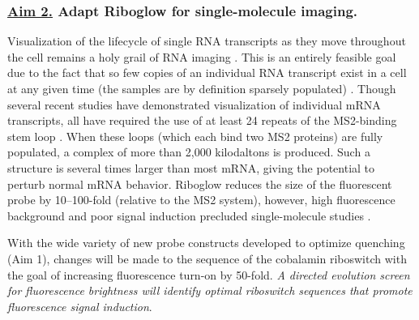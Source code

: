 \subsubsection*{\underline{Aim 2.} Adapt Riboglow for single-molecule imaging.}
Visualization of the lifecycle of single RNA transcripts as they move throughout the cell remains a holy grail of RNA imaging \cite{LiCentraldogmasinglemolecule2011}.
This is an entirely feasible goal due to the fact that so few copies of an individual RNA transcript exist in a cell at any given time (the samples are by definition sparsely populated) \cite{CabiliLocalizationabundanceanalysis2015,LiCentraldogmasinglemolecule2011,AndreckaSinglemoleculetrackingmRNA2008}.
Though several recent studies have demonstrated visualization of individual mRNA transcripts, all have required the use of at least 24 repeats of the MS2-binding stem loop \cite{KatzMappingtranslationhotspots2016,FuscoSinglemRNAMolecules2003,YamagishiSinglemoleculeimagingvactin2009,HalsteadRNAbiosensorimaging2015}.
When these loops (which each bind two MS2 proteins) are fully populated, a complex of more than 2,000 kilodaltons is produced.
Such a structure is several times larger than most mRNA, giving the potential to perturb normal mRNA behavior.
Riboglow reduces the size of the fluorescent probe by 10--100-fold (relative to the MS2 system), however, high fluorescence background and poor signal induction precluded single-molecule studies \cite{BraselmannDevelopmentriboswitchbasedplatform2017}.

With the wide variety of new probe constructs developed to optimize quenching (Aim 1), changes will be made to the sequence of the cobalamin riboswitch with the goal of increasing fluorescence turn-on by 50-fold. \textit{A directed evolution screen for fluorescence brightness will identify optimal riboswitch sequences that promote fluorescence signal induction}.

